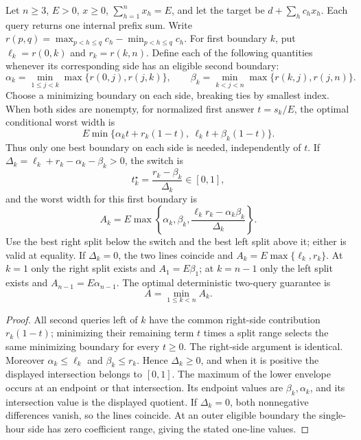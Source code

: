 \begin{proposition}\label{prop:counter-two-query}
Let $n\geq3$, $E>0$, $x\geq0$, $\sum_{h=1}^n x_h=E$, and let the target be
$d+\sum_hc_hx_h$. Each query returns one internal prefix sum. Write
$r(p,q)=\max_{p<h\leq q}c_h-\min_{p<h\leq q}c_h$.
For first boundary $k$, put $\ell_k=r(0,k)$ and $r_k=r(k,n)$.
Define each of the following quantities whenever its corresponding
side has an eligible second boundary:
\[
 \alpha_k=\min_{1\leq j<k}\max\{r(0,j),r(j,k)\},\qquad
 \beta_k=\min_{k<j<n}\max\{r(k,j),r(j,n)\}.
\]
Choose a minimizing boundary on each side, breaking ties by smallest index.
When both sides are nonempty, for normalized first answer $t=s_k/E$,
the optimal conditional worst width is
\[
 E\min\{\alpha_k t+r_k(1-t),\ \ell_k t+\beta_k(1-t)\}.
\]
Thus only one best boundary on each side is needed, independently of $t$.
If $\Delta_k=\ell_k+r_k-\alpha_k-\beta_k>0$, the switch is
\[
 t_k^\star=\frac{r_k-\beta_k}{\Delta_k}\in[0,1],
\]
and the worst width for this first boundary is
\[
 A_k=E\max\left\{\alpha_k,\beta_k,
          \frac{\ell_kr_k-\alpha_k\beta_k}{\Delta_k}\right\}.
\]
Use the best right split below the switch and the best left split above
it; either is valid at equality. If $\Delta_k=0$, the two lines coincide
and $A_k=E\max\{\ell_k,r_k\}$. At $k=1$ only the right split exists and
$A_1=E\beta_1$; at $k=n-1$ only the left split exists and
$A_{n-1}=E\alpha_{n-1}$. The optimal deterministic two-query guarantee is
\begin{equation} A=\min_{1\leq k<n} A_k.\label{eq:counter-adaptive-value}\end{equation}
\end{proposition}
\begin{proof}
All second queries left of $k$ have the common right-side contribution
$r_k(1-t)$; minimizing their remaining term $t$ times a split range
selects the same minimizing boundary for every $t\geq0$. The right-side
argument is identical. Moreover $\alpha_k\leq\ell_k$ and
$\beta_k\leq r_k$. Hence $\Delta_k\geq0$, and when it is positive the
displayed intersection belongs to $[0,1]$. The maximum of the lower
envelope occurs at an endpoint or that intersection. Its endpoint
values are $\beta_k,\alpha_k$, and its intersection value is the displayed
quotient. If $\Delta_k=0$, both nonnegative differences vanish, so the
lines coincide. At an outer eligible boundary the single-hour side has
zero coefficient range, giving the stated one-line values.
\end{proof}

